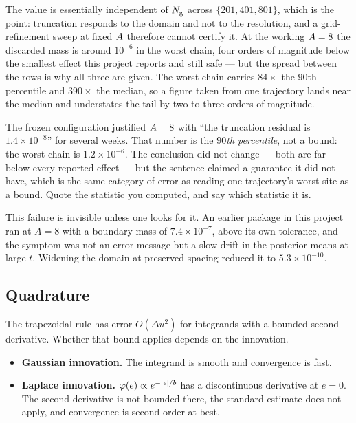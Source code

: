 \noindent
The value is essentially independent of $N_{\mathrm{g}}$ across $\{201,401,801\}$, which is the point:
truncation responds to the domain and not to the resolution, and a grid-refinement sweep at
fixed $A$ therefore cannot certify it. At the working $A=8$ the discarded mass
is around $10^{-6}$ in the worst chain, four orders of magnitude below the smallest effect this
project reports and still safe --- but the spread between the rows is why all three are given. The
worst chain carries $84\times$ the $90$th percentile and $390\times$ the median, so a figure taken
from one trajectory lands near the median and understates the tail by two to three orders of
magnitude.

\begin{pitfall}
The frozen configuration justified $A=8$ with ``the truncation residual is
$1.4\times10^{-8}$'' for several weeks. That number is the \emph{$90$th percentile}, not a bound:
the worst chain is $1.2\times10^{-6}$. The conclusion did not change --- both are far below every
reported effect --- but the sentence claimed a guarantee it did not have, which is the same
category of error as reading one trajectory's worst site as a bound. Quote the statistic you
computed, and say which statistic it is.
\end{pitfall}

\begin{pitfall}
This failure is invisible unless one looks for it. An earlier package in this project ran at
$A=8$ with a boundary mass of $7.4\times10^{-7}$, above its own tolerance, and the symptom was
not an error message but a slow drift in the posterior means at large $t$. Widening the domain
at preserved spacing reduced it to $5.3\times10^{-10}$.
\end{pitfall}

\subsection{Quadrature}
\label{sec:quadrature}

The trapezoidal rule has error $O(\Delta u^2)$ for integrands with a bounded second
derivative. Whether that bound applies depends on the innovation.

\begin{itemize}
\item \textbf{Gaussian innovation.} The integrand is smooth and convergence is fast.
\item \textbf{Laplace innovation.} $\varphi(e)\propto e^{-|e|/b}$ has a discontinuous derivative
at $e=0$. The second derivative is not bounded there, the standard estimate does not apply, and
convergence is second order at best.
\end{itemize}

